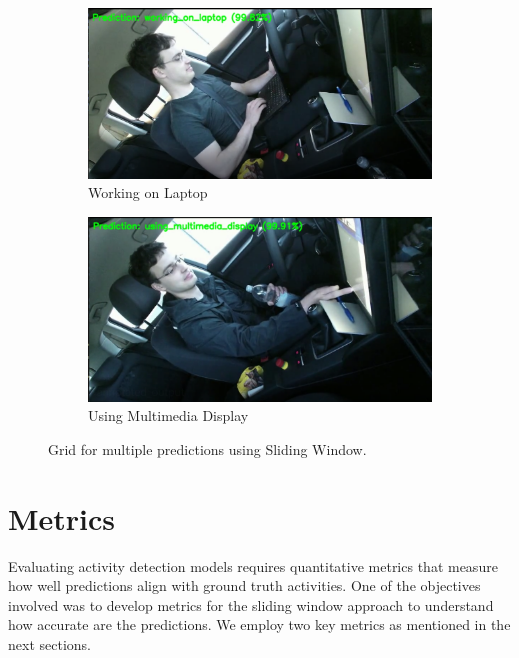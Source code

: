\documentclass{article}
\begin{document}
\begin{figure}[h]
    \begin{subfigure}{0.45\textwidth}
        \centering
        \includegraphics[width=\textwidth]{figs/DAR3.png}
        \caption{Working on Laptop}
    \end{subfigure}
    \hspace{0.5cm}
    \begin{subfigure}{0.45\textwidth}
        \centering
        \includegraphics[width=\textwidth]{figs/DAR4.png}
        \caption{Using Multimedia Display}
    \end{subfigure}

    \caption{Grid for multiple predictions using Sliding Window.}
    \label{fig:image-grid}
\end{figure}

\section{Metrics}
Evaluating activity detection models requires quantitative metrics that measure how well predictions align with ground truth activities. One of the objectives involved was to develop metrics for the sliding window approach to understand how accurate are the predictions. We employ two key metrics as mentioned in the next sections.
\end{document}
